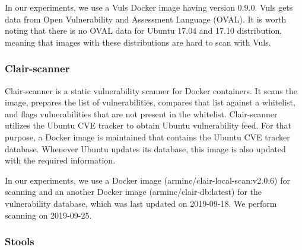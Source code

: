 \documentclass[a4paper,num-refs]{oup-contemporary}
\begin{document}
In our experiments, we use a Vuls Docker image having version 0.9.0. %
Vuls gets data from Open Vulnerability and Assessment Language (OVAL).
It is worth noting that there is no OVAL data for Ubuntu 17.04 and 17.10 distribution,
meaning that images with these distributions are hard to scan with Vuls.

\subsubsection{Clair-scanner}

Clair-scanner is a static vulnerability scanner for Docker containers.
It scans the image, prepares the list of
vulnerabilities, compares that list against a whitelist, and flags vulnerabilities
that are not present in the whitelist.
Clair-scanner utilizes the Ubuntu CVE tracker to obtain  Ubuntu vulnerability feed.
For that purpose, a Docker image is maintained that contains the Ubuntu CVE tracker database.
Whenever Ubuntu updates its database, this image is also updated with the required information.

In our experiments, we use a Docker image (arminc/clair-local-scan:v2.0.6) for scanning
and an another Docker image (arminc/clair-db:latest) for the vulnerability database, which was
last updated on 2019-09-18. We perform
scanning on 2019-09-25.

\subsubsection{Stools}
\end{document}
